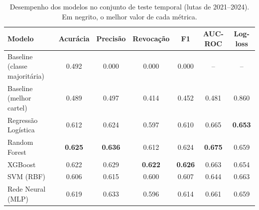 \begin{table}[t]
\centering
\caption{Desempenho dos modelos no conjunto de teste temporal (lutas de 2021--2024). Em negrito, o melhor valor de cada métrica.}
\label{tab:metricas}
\begin{tabular}{lcccccc}
\toprule
Modelo & Acurácia & Precisão & Revocação & F1 & AUC-ROC & Log-loss \\
\midrule
Baseline (classe majoritária) & 0.492 & 0.000 & 0.000 & 0.000 & -- & -- \\
Baseline (melhor cartel) & 0.489 & 0.497 & 0.414 & 0.452 & 0.481 & 0.860 \\
Regressão Logística & 0.612 & 0.624 & 0.597 & 0.610 & 0.665 & \textbf{0.653} \\
Random Forest & \textbf{0.625} & \textbf{0.636} & 0.612 & 0.624 & \textbf{0.675} & 0.659 \\
XGBoost & 0.622 & 0.629 & \textbf{0.622} & \textbf{0.626} & 0.663 & 0.654 \\
SVM (RBF) & 0.606 & 0.615 & 0.600 & 0.607 & 0.644 & 0.663 \\
Rede Neural (MLP) & 0.619 & 0.633 & 0.596 & 0.614 & 0.661 & 0.659 \\
\bottomrule
\end{tabular}
\end{table}
